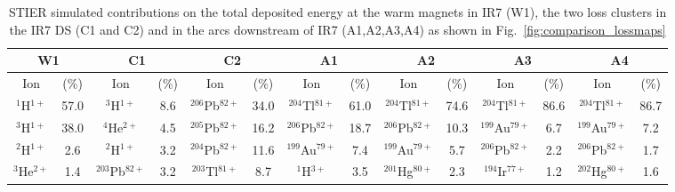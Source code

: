 \begin{table*}[b]
\caption{STIER simulated contributions on the total deposited energy at the warm magnets in IR7 (W1), the two loss clusters in the IR7 DS (C1 and C2) and in the arcs downstream of IR7 (A1,A2,A3,A4) as shown in Fig.~\ref{fig:comparison_lossmaps} }
\small
\setlength\tabcolsep{2.5pt}
\centering
\label{tab:contrib}
\begin{tabular}{cc|cc|cc|cc|cc|cc|cc}
\toprule
\multicolumn{2}{c}{W1}                 & \multicolumn{2}{c}{C1}                 & \multicolumn{2}{c}{C2}         & \multicolumn{2}{c}{A1}                 & \multicolumn{2}{c}{A2}                 & \multicolumn{2}{c}{A3}                 & \multicolumn{2}{c}{A4}                    \\ \midrule
Ion            &  (\%) & Ion            &  (\%) & Ion  & (\%)   &   Ion            &  (\%) & Ion            &  (\%) & Ion            &  (\%) & Ion            &  (\%) \\ \midrule
$^{1}$H$^{1+}$ & 57.0              & $^{3}$H$^{1+}$ & 8.6              & $^{206}$Pb$^{82+}$ & 34.0            & $^{204}$Tl$^{81+}$ & 61.0              & $^{204}$Tl$^{81+}$ & 74.6              & $^{204}$Tl$^{81+}$ & 86.6              & $^{204}$Tl$^{81+}$ & 86.7              \\

$^{3}$H$^{1+}$ & 38.0              & $^{4}$He$^{2+}$ & 4.5              & $^{205}$Pb$^{82+}$ & 16.2          & $^{206}$Pb$^{82+}$ & 18.7              & $^{206}$Pb$^{82+}$ & 10.3              & $^{199}$Au$^{79+}$ & 6.7               & $^{199}$Au$^{79+}$ & 7.2               \\

$^{2}$H$^{1+}$ & 2.6               & $^{2}$H$^{1+}$ & 3.2               & $^{204}$Pb$^{82+}$ & 11.6            & $^{199}$Au$^{79+}$ & 7.4               & $^{199}$Au$^{79+}$ & 5.7               & $^{206}$Pb$^{82+}$ & 2.2               & $^{206}$Pb$^{82+}$ & 1.7               \\

$^{3}$He$^{2+}$     & 1.4               & $^{203}$Pb$^{82+}$ & 3.2               & $^{203}$Tl$^{81+}$ & 8.7         & $^{1}$H$^{3+}$     & 3.5               & $^{201}$Hg$^{80+}$ & 2.3               & $^{194}$Ir$^{77+}$ & 1.2               & $^{202}$Hg$^{80+}$ & 1.6              
\\ \bottomrule             
\end{tabular}
\end{table*}






